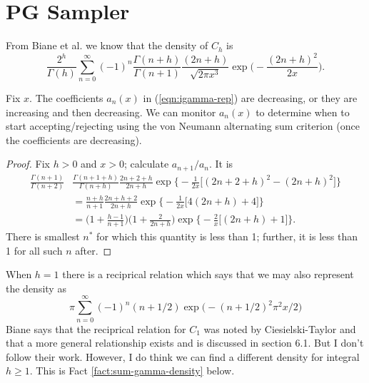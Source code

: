 \documentclass[12pt]{article}
\begin{document}

\newpage


\section{PG Sampler}

From Biane et al. we know that the density of $C_h$ is
\begin{equation}
\label{eqn:igamma-rep}
\frac{2^h}{\Gamma(h)} \sum_{n=0}^{\infty} (-1)^n \frac{\Gamma(n+h)}{\Gamma(n+1)} 
\frac{(2n+h)}{\sqrt{2 \pi x^3}} \exp \Big( - \frac{(2n+h)^2}{2 x} \Big).
\end{equation}

\begin{fact}
  Fix $x$.  The coefficients $a_n(x)$ in (\ref{eqn:igamma-rep}) are decreasing,
  or they are increasing and then decreasing. We can monitor $a_n(x)$ to
  determine when to start accepting/rejecting using the von Neumann alternating
  sum criterion (once the coefficients are decreasing).
\end{fact}

\begin{proof}
Fix $h > 0$ and $x > 0$; calculate $a_{n+1} / a_{n}$.  It is
\begin{align*}
\frac {\Gamma(n+1)}{\Gamma(n+2)} & \frac {\Gamma(n+1+h)}{\Gamma(n+h)}
\frac {2n + 2 + h}{2n+h} \exp \Big\{ -\frac{1}{2x} \Big[ (2n+2+h)^2 - (2n+h)^2
\Big] \Big\} \\
& = \frac{n+h}{n+1} \frac{2n+h+2}{2n+h} \exp \Big\{ -\frac{1}{2x} \Big[ 4 (2n+h) +
4 \Big] \Big\} \\
& = \Big(1 + \frac{h-1}{n+1}\Big) \Big(1 + \frac{2}{2n+h}\Big) \exp \Big\{ -\frac{2}{x} \Big[ (2n+h) +
1 \Big] \Big\}.
\end{align*}
There is smallest $n^*$ for which this quantity is less than 1; further, it
is less than 1 for all such $n$ after.
\end{proof}

When $h=1$ there is a reciprical relation which says that we may also represent
the density as
\begin{equation}
\label{eqn:exp-rep}
\pi \sum_{n=0}^\infty (-1)^n (n+1/2) \exp \Big( -(n+1/2)^2 \pi^2 x / 2 \Big)
\end{equation}
Biane says that the reciprical relation for $C_1$ was noted by Ciesielski-Taylor
and that a more general relationship exists and is discussed in section 6.1.
But I don't follow their work.  However, I do think we can find a different
density for integral $h \geq 1$.  This is Fact \ref{fact:sum-gamma-density} below.
\end{document}
